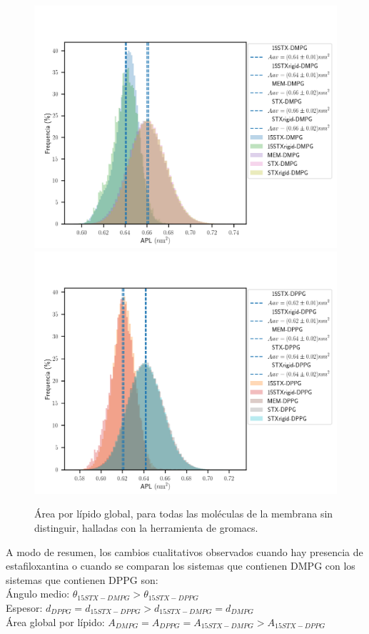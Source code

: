 \begin{figure}[h]
\begin{center}
  \includegraphics[scale=0.2]{Plots/APL_hist_DMPG.png}
  \includegraphics[scale=0.2]{Plots/APL_hist_DPPG.png}
  \caption{\'{A}rea por l\'{i}pido global, para todas las mol\'{e}culas de la membrana sin distinguir, halladas con la herramienta de gromacs.} 
  \label{fig:aplglobal}
\end{center}
\end{figure}
A modo de resumen, los cambios cualitativos observados cuando hay presencia de estafiloxantina o cuando se comparan los sistemas que contienen DMPG con los sistemas que contienen DPPG son:\\
\'{A}ngulo medio: $\theta_{15STX-DMPG}>\theta_{15STX-DPPG}$ \\
Espesor: $d_{DPPG}=d_{15STX-DPPG}>d_{15STX-DMPG}=d_{DMPG}$ \\
\'{A}rea global por l\'{i}pido: $A_{DMPG}=A_{DPPG}=A_{15STX-DMPG}>A_{15STX-DPPG}$ \\
